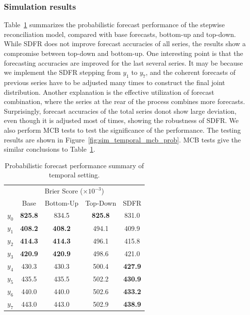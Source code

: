 \documentclass[a4paper,review,12pt,authoryear]{elsarticle}
\begin{document}
\subsubsection{Simulation results}

Table~\ref{tab:sim_temporal_res_dist} summarizes the probabilistic forecast performance of the stepwise reconciliation model, compared with base forecasts, bottom-up and top-down.
While SDFR does not improve forecast accuracies of all series, the results
show a compromise between top-down and bottom-up. 
One interesting point is that the forecasting accuracies are improved for the last several series. 
It may be because we implement the SDFR stepping from $y_1$ to $y_7$, and the coherent forecasts of previous series have to be adjusted many times to construct the final joint distribution.
Another explanation is the effective utilization of forecast combination, where the series at the rear of the process combines more forecasts.
Surprisingly, forecast accuracies of the total series donot show large deviation,  even though it is adjusted most of times, showing the robustness of SDFR.
We also perform MCB tests to test the significance of the performance. 
The testing results are shown in Figure~\ref{fig:sim_temporal_mcb_prob}. 
MCB tests give the similar conclusions to Table~\ref{tab:sim_temporal_res_dist}. 

\begin{table}
\centering
\caption{\label{tab:sim_temporal_res_dist} Probabilistic forecast performance summary of temporal setting.}
\begin{tabular}{lcccc}
\toprule
\multicolumn{5}{c}{Brier Score ($\times 10^{-3}$)}\\ 
 & Base & Bottom-Up & Top-Down & SDFR \\\midrule
$y_0$ & \textbf{825.8} & 834.5          & \textbf{825.8} & 831.0\\
$y_1$ & \textbf{408.2} & \textbf{408.2} & 494.1 & 409.9 \\
$y_2$ & \textbf{414.3} & \textbf{414.3} & 496.1 & 415.8\\
$y_3$ & \textbf{420.9} & \textbf{420.9} & 498.6 & 421.0\\
$y_4$ & 430.3 & 430.3  & 500.4          & \textbf{427.9}\\
$y_5$ & 435.5 & 435.5  & 502.2          & \textbf{430.9} \\
$y_6$ & 440.0 & 440.0  & 502.6          & \textbf{433.2} \\
$y_7$ & 443.0 & 443.0  & 502.9          & \textbf{438.9} \\
\bottomrule
\end{tabular}
\end{table}
\end{document}
